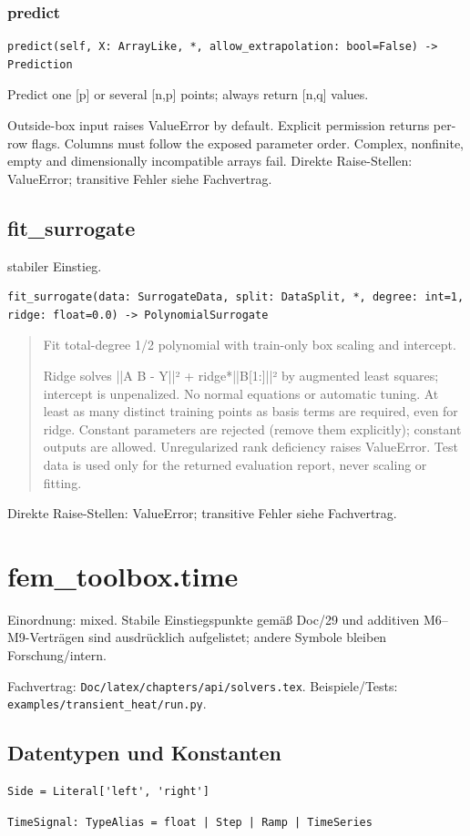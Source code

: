 \subsubsection*{predict}
\begin{lstlisting}
predict(self, X: ArrayLike, *, allow_extrapolation: bool=False) -> Prediction
\end{lstlisting}
Predict one [p] or several [n,p] points; always return [n,q] values.\par Outside-box input raises ValueError by default. Explicit permission returns per-row flags. Columns must follow the exposed parameter order. Complex, nonfinite, empty and dimensionally incompatible arrays fail.
Direkte Raise-Stellen: ValueError; transitive Fehler siehe Fachvertrag.
\subsection{fit\_surrogate}
stabiler Einstieg.
\begin{lstlisting}
fit_surrogate(data: SurrogateData, split: DataSplit, *, degree: int=1, ridge: float=0.0) -> PolynomialSurrogate
\end{lstlisting}
\begin{quote}
Fit total-degree 1/2 polynomial with train-only box scaling and intercept.\par Ridge solves ||A B - Y||² + ridge*||B[1:]||² by augmented least squares; intercept is unpenalized. No normal equations or automatic tuning. At least as many distinct training points as basis terms are required, even for ridge. Constant parameters are rejected (remove them explicitly); constant outputs are allowed. Unregularized rank deficiency raises ValueError. Test data is used only for the returned evaluation report, never scaling or fitting.
\end{quote}
Direkte Raise-Stellen: ValueError; transitive Fehler siehe Fachvertrag.
\section{fem\_toolbox.time}
Einordnung: mixed. Stabile Einstiegspunkte gemäß Doc/29 und additiven M6–M9-Verträgen sind ausdrücklich aufgelistet; andere Symbole bleiben Forschung/intern.
\par Fachvertrag: \nolinkurl{Doc/latex/chapters/api/solvers.tex}. Beispiele/Tests:
\nolinkurl{examples/transient_heat/run.py}.
\subsection*{Datentypen und Konstanten}
\begin{lstlisting}
Side = Literal['left', 'right']
\end{lstlisting}
\begin{lstlisting}
TimeSignal: TypeAlias = float | Step | Ramp | TimeSeries
\end{lstlisting}

